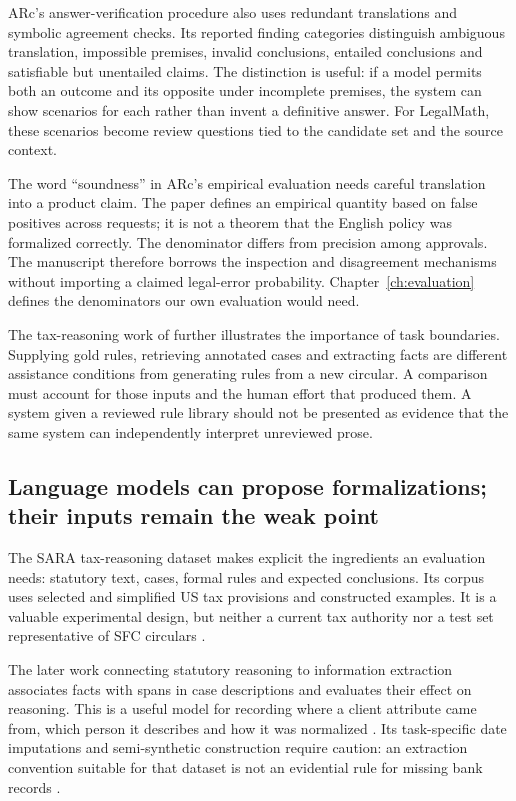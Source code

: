\documentclass[12pt,a4paper,oneside,openany]{book}
\begin{document}
ARc's answer-verification procedure also uses redundant translations and
symbolic agreement checks. Its reported finding categories distinguish
ambiguous translation, impossible premises, invalid conclusions, entailed
conclusions and satisfiable but unentailed claims. The distinction is useful:
if a model permits both an outcome and its opposite under incomplete premises,
the system can show scenarios for each rather than invent a definitive answer.
For LegalMath, these scenarios become review questions tied to the candidate
set and the source context.

The word ``soundness'' in ARc's empirical evaluation needs careful translation
into a product claim. The paper defines an empirical quantity based on false
positives across requests; it is not a theorem that the English policy was
formalized correctly. The denominator differs from precision among approvals.
The manuscript therefore borrows the inspection and disagreement mechanisms
without importing a claimed legal-error probability. Chapter~\ref{ch:evaluation}
defines the denominators our own evaluation would need.

The tax-reasoning work of \citet{jurayj2026} further illustrates the importance
of task boundaries. Supplying gold rules, retrieving annotated cases and
extracting facts are different assistance conditions from generating rules
from a new circular. A comparison must account for those inputs and the human
effort that produced them. A system given a reviewed rule library should not
be presented as evidence that the same system can independently interpret
unreviewed prose.

\subsection{Language models can propose formalizations; their inputs remain the weak point}
\label{merge:P-02-literature:07}


The SARA tax-reasoning dataset makes explicit the ingredients an evaluation needs:
statutory text, cases, formal rules and expected conclusions. Its corpus uses
selected and simplified US tax provisions and constructed examples. It is a
valuable experimental design, but neither a current tax authority nor a test set
representative of SFC circulars \citep[secs.~2--3]{sara2020}.

The later work connecting statutory reasoning to information extraction associates
facts with spans in case descriptions and evaluates their effect on reasoning.
This is a useful model for recording where a client attribute came from, which
person it describes and how it was normalized
\citep[secs.~3--5]{connecting2023}. Its task-specific date imputations and
semi-synthetic construction require caution: an extraction convention suitable
for that dataset is not an evidential rule for missing bank records
\citep[sec.~7 and apps.~B, E]{connecting2023}.
\end{document}

